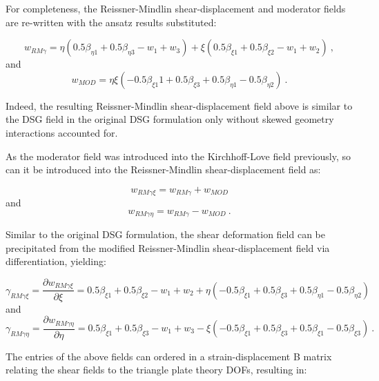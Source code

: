 For completeness, the Reissner-Mindlin shear-displacement and moderator fields are re-written with the ansatz results substituted:

\begin{equation} 
w_{RM \gamma} = \eta(0.5 \beta_{\eta 1} + 0.5\beta_{\eta 3} - w_1 + w_3) + \xi(0.5\beta_{\xi 1} + 0.5\beta_{\xi 2} - w_1 + w_2)
\label{eqDSGc3_21}\ ,
\end{equation}
and
\begin{equation} 
w_{MOD} = \eta\xi(-0.5\beta_{\xi 1}1 + 0.5\beta_{\xi 3} + 0.5\beta_{\eta 1} - 0.5\beta_{\eta 2})
\label{eqDSGc3_22}\ .
\end{equation}

Indeed, the resulting Reissner-Mindlin shear-displacement field above is similar to the DSG field in the original DSG formulation only without skewed geometry interactions accounted for.

As the moderator field was introduced into the Kirchhoff-Love field previously, so can it be introduced into the Reissner-Mindlin shear-displacement field as:

\begin{equation} 
w_{RM \gamma \xi} = w_{RM \gamma} + w_{MOD} 
\label{eqDSGc3_6}
\end{equation}
and
\begin{equation} 
w_{RM \gamma \eta} = w_{RM \gamma} - w_{MOD} 
\label{eqDSGc3_7}\ .
\end{equation}

Similar to the original DSG formulation, the shear deformation field can be precipitated from the modified Reissner-Mindlin shear-displacement field via differentiation, yielding:

\begin{equation} 
\gamma_{RM \gamma \xi} = \frac{\partial w_{RM \gamma \xi}}{\partial \xi}  = 0.5\beta_{\xi 1} + 0.5\beta_{\xi 2} - w_1 + w_2 + \eta(-0.5\beta_{\xi 1} + 0.5\beta_{\xi 3} + 0.5\beta_{\eta 1} - 0.5\beta_{\eta 2})
\label{eqDSGc3_23}
\end{equation} 
and
\begin{equation} 
\gamma_{RM \gamma \eta} = \frac{\partial w_{RM \gamma \eta}}{\partial \eta}  = 0.5\beta_{\xi 1} + 0.5\beta_{\xi 3} - w_1 + w_3 - \xi(-0.5\beta_{\xi 1} + 0.5\beta_{\xi 3} + 0.5\beta_{\xi 1} - 0.5\beta_{\xi 3})
\label{eqDSGc3_25}\ .
\end{equation}

The entries of the above fields can ordered in a strain-displacement B matrix relating the shear fields to the triangle plate theory DOFs, resulting in:

